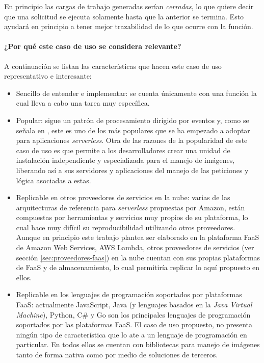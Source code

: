 En principio las cargas de trabajo generadas serían \emph{cerradas}, lo que quiere decir que una solicitud se ejecuta solamente hasta que la anterior se termina. Esto ayudará en principio a tener mejor trazabilidad de lo que ocurre con la función.

\paragraph{¿Por qué este caso de uso se considera relevante?}
A continuación se listan las características que hacen este caso de uso representativo e interesante:
\begin{itemize}
    \item Sencillo de entender e implementar: se cuenta únicamente con una función la cual lleva a cabo una tarea muy específica.
    \item Popular: sigue un patrón de procesamiento dirigido por eventos y, como se señala en \cite{serverless-architecture-patterns}, este es uno de los más populares que se ha empezado a adoptar para aplicaciones \emph{serverless}. Otra de las razones de la popularidad de este caso de uso es que permite a los desarrolladores crear una unidad de instalación independiente y especializada para el manejo de imágenes, liberando así a sus servidores y aplicaciones del manejo de las peticiones y lógica asociadas a estas.
    \item Replicable en otros proveedores de servicios en la nube: varias de las arquitecturas de referencia para \emph{serverless} propuestas por Amazon, están compuestas por herramientas y servicios muy propios de su plataforma, lo cual hace muy difícil su reproducibilidad utilizando otros proveedores. Aunque en principio este trabajo plantea ser elaborado en la plataforma FaaS de Amazon Web Services, AWS Lambda, otros proveedores de servicios (ver sección \ref{sec:proveedores-faas}) en la nube cuentan con sus propias plataformas de FaaS y de almacenamiento, lo cual permitiría replicar lo aquí propuesto en ellos.
    \item Replicable en los lenguajes de programación soportados por plataformas FaaS: actualmente JavaScript, Java (y lenguajes basados en la \emph{Java Virtual Machine}), Python, C\# y Go son los principales lenguajes de programación soportados por las plataformas FaaS. El caso de uso propuesto, no presenta ningún tipo de característica que lo ate a un lenguaje de programación en particular. En todos ellos se cuentan con bibliotecas para manejo de imágenes tanto de forma nativa como por medio de soluciones de terceros. 
\end{itemize}


